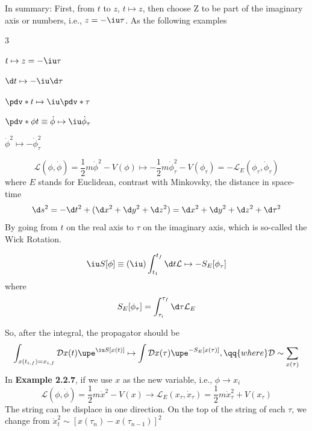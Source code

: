 In summary: First, from $t$ to $z$, $t \mapsto z$,
then choose Z to be part of the imaginary axis or numbers, i.e., $z = -\iu\tau$. As the following examples
\begin{framed}
  \begin{multicols}{3}
  \begin{example}
    $t \mapsto z = -\iu\tau$
  \end{example}
  \begin{example}
    $\d t \mapsto -\iu\d\tau$
  \end{example}
  \begin{example}
    $\pdv*{}t \mapsto \iu \pdv*{}\tau$
  \end{example}
  \begin{example}
    $\pdv*\phi t \equiv \dot \phi \mapsto \iu \dot\phi_\tau$
  \end{example}
  \begin{example}
    $\dot\phi^2 \mapsto -\dot\phi_\tau^2$
  \end{example}
  \end{multicols}
  \begin{example}
    \[
      \mathcal L(\phi, \dot\phi)
    = \frac12m\dot\phi^2 - V(\phi)
      \mapsto -\frac12m\dot\phi_\tau^2 - V(\phi_\tau)
    = -\mathcal L_E(\phi_\tau, \dot \phi_\tau)
    \]
    where $E$ stands for Euclidean, contrast with Minkovsky,
    the distance in space-time
    \[
      \d s^2 = -\d t^2 + (\d x^2 + \d y^2 + \d z^2)
    = \d x^2 + \d y^2 + \d z^2 + \d \tau^2
    \]
    By going from $t$ on the real axis to $\tau$ on the imaginary axis, which is so-called the Wick Rotation.
  \end{example}
  \begin{example}
    \[
      \iu S[\phi] \equiv (\iu ) \int_{t_1}^{t_f} \d t \mathcal L
    \mapsto - S_E[\phi_\tau]
    \]
    where
    \[
      S_E[\phi_\tau] = \int_{\tau_i}^{\tau_f} \d\tau \mathcal L_E
    \]
  \end{example}
\end{framed}
So, after the integral, the propagator should be
\[
  \int_{x(t_{i,f}) = x_{i,f}} \mathcal D x(t) \upe^{\iu S[x(t)]} \mapsto
  \int \mathcal D x(\tau) \upe^{-S_E[x(\tau)]},\qq{where}
  \mathcal D \sim \sum_{x(\tau)}
\]
In \textbf{\textsf{Example 2.2.7}}, if we use $x$ as the new variable, i.e., $\phi \to x_i$
\[
  \mathcal L(\phi, \dot\phi) = \frac12 m\dot x^2 - V(x)
  \longrightarrow
  \mathcal L_E(x_\tau, \dot x_\tau) = \frac12 m\dot x_\tau^2 + V(x_\tau)
\]
The string can be displace in one direction. On the top of the string of each $\tau$, we change from $\dot x_t^2 \sim [x(\tau_n) - x(\tau_{n-1})]^2$
